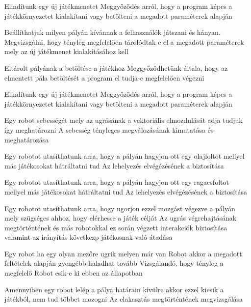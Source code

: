 %
{Elindítunk egy új játékmenetet}%
{Meggyőződés arról, hogy a program képes a játékkörnyezetet kialakítani vagy betölteni a megadott paraméterek alapján}

%
{Beállíthatjuk milyen pályán kívánnak a felhasználók játszani és hányan.}%
{Megvizsgálni, hogy tényleg megfelelően tárolódtak-e el a megadott paraméterek mely az új játékmenet kialakításához kell}

%
{Eltárolt pályának a betöltése a játékhoz}%
{Meggyőzödhetünk általa, hogy az elmentett pála betöltését a program el tudja-e megfelelően végezni}

%
{Elindítunk egy új játékmenetet}%
{Meggyőződés arról, hogy a program képes a játékkörnyezetet kialakítani vagy betölteni a megadott paraméterek alapján}

%
{Egy robot sebességét mely az ugrásának a vektoriális elmozdulását adja tudjuk így meghatározni}%
{A sebesség tényleges megválozásának kimutatása és meghatározása}

%
{Egy robotot utasíthatunk arra, hogy a pályán hagyjon ott egy olajfoltot mellyel más játékosokat hátráltatni tud}%
{Az lehelyezés elvégézésének a biztosítása}

%
{Egy robotot utasíthatunk arra, hogy a pályán hagyjon ott egy ragacsfoltot mellyel más játékosokat hátráltatni tud}%
{Az lehelyezés elvégézésének a biztosítása}

%
{Egy robotot utasíthatunk arra, hogy ugorjon ezzel mozgást végezve a pályán mely szügséges ahhoz, hogy elérhesse a játék célját}%
{Az ugrás végrehajtásának megtörténtének és más robotokkal ez során végzett interakciók biztosítása valamint az irányítás következp játékosnak való átadása}

%
{Egy robot ha egy olyan mezőre ugrik melyen már van Robot akkor a megadott feltételek alapján gyengébb haladhat tovább}%
{Vizsgálandó, hogy tényleg a megfelelő Robot esik-e ki ebben az állapotban}

%
{Amennyiben egy robot lelép a pálya határain kívülre akkor ezzel kiesik a játékból, nem tud többet mozogni}%
{Az elakasztás megtörténtének megvizsgálása}

